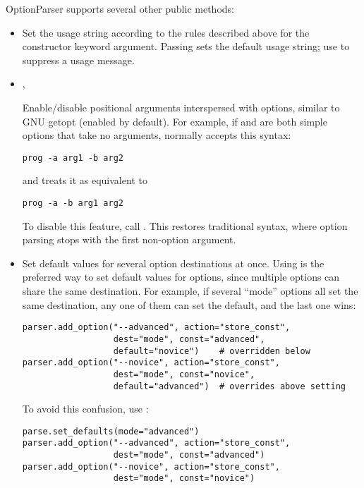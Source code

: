 OptionParser supports several other public methods:
\begin{itemize}
\item {} 

Set the usage string according to the rules described above for the
 constructor keyword argument.  Passing  sets the
default usage string; use  to suppress a usage
message.

\item {} 
, 

Enable/disable positional arguments interspersed with options, similar
to GNU getopt (enabled by default).  For example, if  and
 are both simple options that take no arguments, 
normally accepts this syntax:
\begin{verbatim}
prog -a arg1 -b arg2
\end{verbatim}

and treats it as equivalent to
\begin{verbatim}
prog -a -b arg1 arg2
\end{verbatim}

To disable this feature, call .  This
restores traditional \UNIX{} syntax, where option parsing stops with the
first non-option argument.

\item {} 

Set default values for several option destinations at once.  Using
 is the preferred way to set default values for
options, since multiple options can share the same destination.  For
example, if several ``mode'' options all set the same destination, any
one of them can set the default, and the last one wins:
\begin{verbatim}
parser.add_option("--advanced", action="store_const",
                  dest="mode", const="advanced",
                  default="novice")    # overridden below
parser.add_option("--novice", action="store_const",
                  dest="mode", const="novice",
                  default="advanced")  # overrides above setting
\end{verbatim}

To avoid this confusion, use :
\begin{verbatim}
parse.set_defaults(mode="advanced")
parser.add_option("--advanced", action="store_const",
                  dest="mode", const="advanced")
parser.add_option("--novice", action="store_const",
                  dest="mode", const="novice")
\end{verbatim}

\end{itemize}


